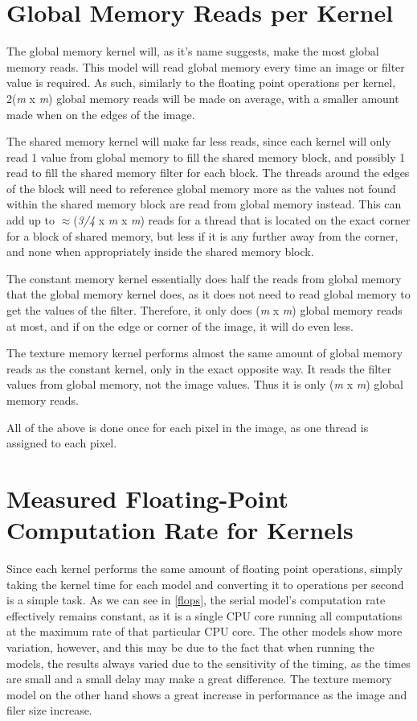 \documentclass[a4paper,twoside,11pt]{report}
\begin{document}
\section{Global Memory Reads per Kernel}

The global memory kernel will, as it's name suggests, make the most global memory reads. This model will read global memory every time an image or filter value is required. As such, similarly to the floating point operations per kernel, 2(\textit{m} x \textit{m}) global memory reads will be made on average, with a smaller amount made when on the edges of the image.

The shared memory kernel will make far less reads, since each kernel will only read 1 value from global memory to fill the shared memory block, and possibly 1 read to fill the shared memory filter for each block. The threads around the edges of the block will need to reference global memory more as the values not found within the shared memory block are read from global memory instead. This can add up to $\approx$(\textit{3/4} x \textit{m} x \textit{m}) reads for a thread that is located on the exact corner for a block of shared memory, but less if it is any further away from the corner, and none when appropriately inside the shared memory block.

The constant memory kernel essentially does half the reads from global memory that the global memory kernel does, as it does not need to read global memory to get the values of the filter. Therefore, it only does (\textit{m} x \textit{m}) global memory reads at most, and if on the edge or corner of the image, it will do even less.

The texture memory kernel performs almost the same amount of global memory reads as the constant kernel, only in the exact opposite way. It reads the filter values from global memory, not the image values. Thus it is only (\textit{m} x \textit{m}) global memory reads.

All of the above is done once for each pixel in the image, as one thread is assigned to each pixel.

\section{Measured Floating-Point Computation Rate for Kernels}
Since each kernel performs the same amount of floating point operations, simply taking the kernel time for each model and converting it to operations per second is a simple task. As we can see in \cref{flops}, the serial model's computation rate effectively remains constant, as it is a single CPU core running all computations at the maximum rate of that particular CPU core. The other models show more variation, however, and this may be due to the fact that when running the models, the results always varied due to the sensitivity of the timing, as the times are small and a small delay may make a great difference. The texture memory model on the other hand shows a great increase in performance as the image and filer size increase.
\end{document}
